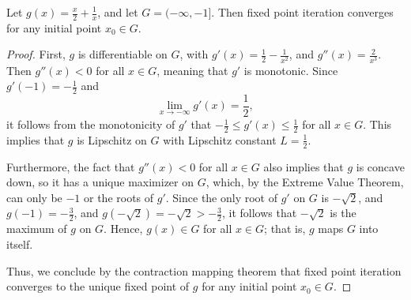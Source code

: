 \documentclass{homework}
\begin{document}
\question 
Let $g(x) = \frac{x}{2} + \frac{1}{x}$, and let $G = (-\infty, -1]$. Then fixed point iteration converges for any initial point $x_0 \in G$.
\begin{proof}
	First, $g$ is differentiable on $G$, with $g'(x) = \frac{1}{2} - \frac{1}{x^2}$, and $g''(x) = \frac{2}{x^3}$. Then $g''(x) < 0$ for all $x \in G$, meaning that $g'$ is monotonic. Since $g'(-1) = -\frac{1}{2}$ and
	\begin{equation*}
		\lim_{x\to-\infty}g'(x) = \frac{1}{2},
	\end{equation*}
	it follows from the monotonicity of $g'$ that $-\frac{1}{2}\le g'(x) \le \frac{1}{2}$ for all $x \in G$. This implies that $g$ is Lipschitz on $G$ with Lipschitz constant $L = \frac{1}{2}$.
	
	Furthermore, the fact that $g''(x) < 0$ for all $x \in G$ also implies that $g$ is concave down, so it has a unique maximizer on $G$, which, by the Extreme Value Theorem, can only be $-1$ or the roots of $g'$. Since the only root of $g'$ on $G$ is $-\sqrt{2}$, and $g(-1) = -\frac{3}{2}$, and $g(-\sqrt{2}) = -\sqrt{2} > -\frac{3}{2}$, it follows that $-\sqrt{2}$ is the maximum of $g$ on $G$. Hence, $g(x) \in G$ for all $x \in G$; that is, $g$ maps $G$ into itself.
	
	Thus, we conclude by the contraction mapping theorem that fixed point iteration converges to the unique fixed point of $g$ for any initial point $x_0 \in G$.
\end{proof}
\end{document}
